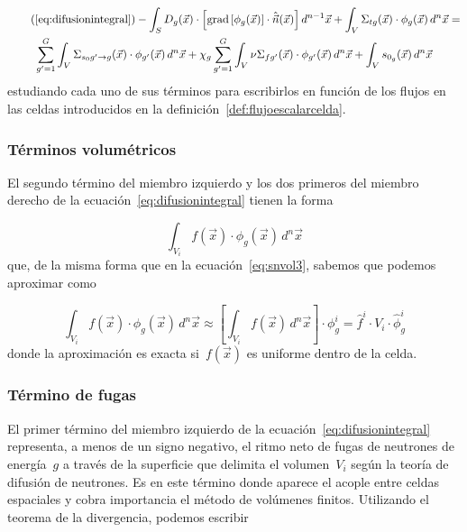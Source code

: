 \begin{multline}\tag{\ref{eq:difusionintegral}}
 - \int_S D_g(\vec{x}) \cdot \Big[ \text{grad} \left[ \phi_g(\vec{x}) \right] \cdot \hat{\vec{n}}(\vec{x}) \Big] \, d^{n-1} \vec{x}
 + \int_V \Sigma_{t g}(\vec{x}) \cdot \phi_g(\vec{x}) \, d^n \vec{x}
 = \\
 \sum_{g^\prime = 1}^G \int_V \Sigma_{s_0 g^\prime \rightarrow g}(\vec{x})  \cdot \phi_{g^\prime}(\vec{x}) \, d^n \vec{x}
+
 \chi_g \sum_{g^\prime = 1}^G \int_V  \nu\Sigma_{fg^\prime}(\vec{x}) \cdot \phi_{g^\prime}(\vec{x}) \, d^n \vec{x}
 +
\int_V s_{0_g}(\vec{x}) \, d^n \vec{x}
\end{multline}
%
estudiando cada uno de sus términos para escribirlos en función de los flujos en las celdas introducidos en la definición~\ref{def:flujoescalarcelda}.

\subsubsection{Términos volumétricos} %

El segundo término del miembro izquierdo y los dos primeros del miembro derecho de la ecuación~\eqref{eq:difusionintegral} tienen la forma

\begin{equation*}
 \int_{V_i} f(\vec{x}) \cdot \phi_g(\vec{x}) \, d^n\vec{x} 
\end{equation*}
%
que, de la misma forma que en la ecuación~\eqref{eq:snvol3}, sabemos que podemos aproximar como

\begin{equation}\label{eq:difvol3}
  \int_{V_i} f(\vec{x}) \cdot \phi_g(\vec{x}) \, d^n\vec{x} \approx \left[ \int_{V_i} f(\vec{x}) \, d^n\vec{x} \right] \cdot \phi_{g}^i = \hat{f}^i \cdot V_i \cdot \hat{\phi}_g^i
\end{equation}
%
donde la aproximación es exacta si~$f(\vec{x})$ es uniforme dentro de la celda. 

\subsubsection{Término de fugas} %


El primer término del miembro izquierdo de la ecuación~\eqref{eq:difusionintegral} representa, a menos de un signo negativo, el ritmo neto de fugas de neutrones de energía~$g$ a través de la superficie que delimita el volumen~$V_i$ según la teoría de difusión de neutrones. Es en este término donde aparece el acople entre celdas espaciales y cobra importancia el método de volúmenes finitos. Utilizando el teorema de la divergencia, podemos escribir

